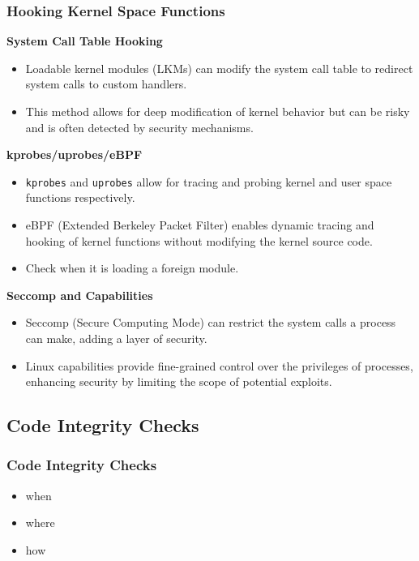 \begin{frame}
    \frametitle{Hooking Kernel Space Functions}
    \textbf{System Call Table Hooking}
    \begin{itemize}
        \item Loadable kernel modules (LKMs) can modify the system call table to redirect system calls to custom handlers.
        \item This method allows for deep modification of kernel behavior but can be risky and is often detected by security mechanisms.
    \end{itemize}
    \textbf{kprobes/uprobes/eBPF}
    \begin{itemize}
        \item \texttt{kprobes} and \texttt{uprobes} allow for tracing and probing kernel and user space functions respectively.
        \item eBPF (Extended Berkeley Packet Filter) enables dynamic tracing and hooking of kernel functions without modifying the kernel source code.
        \item Check when it is loading a foreign module.
    \end{itemize}
    \textbf{Seccomp and Capabilities}
    \begin{itemize}
        \item Seccomp (Secure Computing Mode) can restrict the system calls a process can make, adding a layer of security.
        \item Linux capabilities provide fine-grained control over the privileges of processes, enhancing security by limiting the scope of potential exploits.
    \end{itemize}
\end{frame}

\subsection{Code Integrity Checks}
\begin{frame}
    \frametitle{Code Integrity Checks}
    \begin{itemize}
        \item when
        \item where
        \item how
    \end{itemize}
\end{frame}

